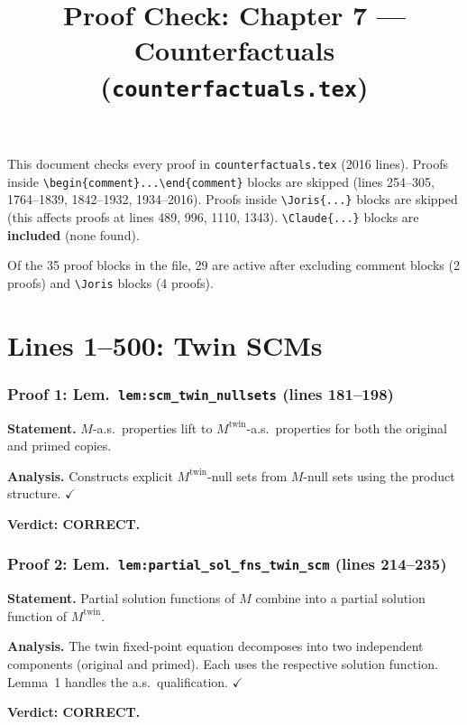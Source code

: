 \documentclass{article}
\title{Proof Check: Chapter 7 --- Counterfactuals\\(\texttt{counterfactuals.tex})}
\date{}
\begin{document}
\maketitle

This document checks every proof in \texttt{counterfactuals.tex} (2016 lines).
Proofs inside \verb|\begin{comment}...\end{comment}| blocks are skipped
(lines 254--305, 1764--1839, 1842--1932, 1934--2016).
Proofs inside \verb|\Joris{...}| blocks are skipped
(this affects proofs at lines 489, 996, 1110, 1343).
\verb|\Claude{...}| blocks are \textbf{included} (none found).

Of the 35 proof blocks in the file, 29 are active after excluding comment
blocks (2 proofs) and \verb|\Joris| blocks (4 proofs).

\part*{Lines 1--500: Twin SCMs}

\section{Proof 1: Lem.\ \texttt{lem:scm\_twin\_nullsets} (lines 181--198)}
\textbf{Statement.} $M$-a.s.\ properties lift to $M^{\mathrm{twin}}$-a.s.\
properties for both the original and primed copies.

\textbf{Analysis.} Constructs explicit $M^{\mathrm{twin}}$-null sets from
$M$-null sets using the product structure.  $\checkmark$

\textbf{Verdict: CORRECT.}

\section{Proof 2: Lem.\ \texttt{lem:partial\_sol\_fns\_twin\_scm} (lines 214--235)}
\textbf{Statement.} Partial solution functions of $M$ combine into a partial
solution function of $M^{\mathrm{twin}}$.

\textbf{Analysis.} The twin fixed-point equation decomposes into two independent
components (original and primed).  Each uses the respective solution function.
Lemma~1 handles the a.s.\ qualification.  $\checkmark$

\textbf{Verdict: CORRECT.}
\end{document}
